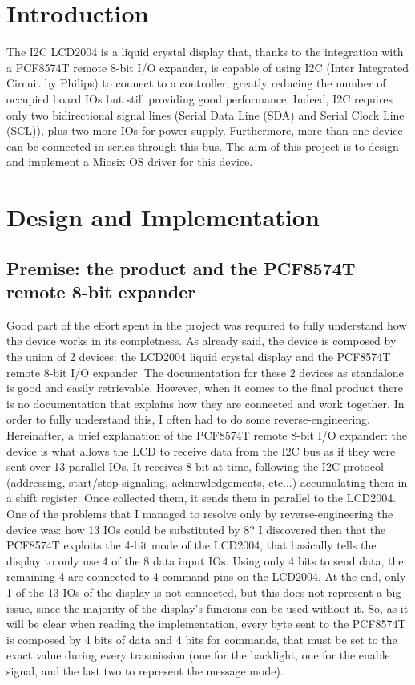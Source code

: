 \documentclass[12pt]{article}
\begin{document}
\section{Introduction}

The I2C LCD2004 is a liquid crystal display that, thanks to the integration with a PCF8574T remote 8-bit I/O expander, is capable of using I2C (Inter Integrated Circuit by Philips) to connect to a controller, greatly reducing the number of occupied board IOs but still providing good performance. Indeed, I2C requires only two bidirectional signal lines (Serial Data Line (SDA) and Serial Clock Line (SCL)), plus two more IOs for power supply. Furthermore, more than one device can be connected in series through this bus.
The aim of this project is to design and implement a Miosix OS driver for this device.


\section{Design and Implementation}

\subsection{Premise: the product and the PCF8574T remote 8-bit expander}
Good part of the effort spent in the project was required to fully understand how the device works in its completness. As already said, the device is composed by the union of 2 devices: the LCD2004 liquid crystal display and the PCF8574T remote 8-bit I/O expander. The documentation for these 2 devices as standalone is good and easily retrievable. However, when it comes to the final product there is no documentation that explains how they are connected and work together. In order to fully understand this, I often had to do some reverse-engineering.
Hereinafter, a brief explanation of the PCF8574T remote 8-bit I/O expander:
the device is what allows the LCD to receive data from the I2C bus as if they were sent over 13 parallel IOs. It receives 8 bit at time, following the I2C protocol (addressing, start/stop signaling, acknowledgements, etc...) accumulating  them in a shift register. Once collected them, it sends them in parallel to the LCD2004. One of the problems that I managed to resolve only by reverse-engineering the device was: how 13 IOs could be substituted by 8? I discovered then that the PCF8574T exploits the 4-bit mode of the LCD2004, that basically tells the display to only use 4 of the 8 data input IOs. Using only 4 bits to send data, the remaining 4 are connected to 4 command pins on the LCD2004. At the end, only 1 of the 13 IOs of the display is not connected, but this does not represent a big issue, since the majority of the display's funcions can be used without it. So, as it will be clear when reading the implementation, every byte sent to the PCF8574T is composed by 4 bits of data and 4 bits for commands, that must be set to the exact value during every trasmission (one for the backlight, one for the enable signal, and the last two to represent the message mode).
\end{document}
